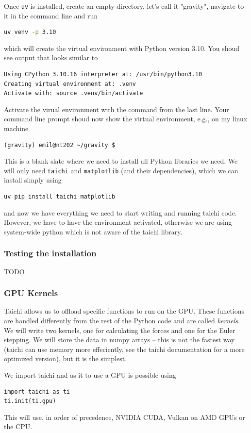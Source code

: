 \documentclass{article}
\newcommand{\ls}[1]{\lstinline{#1}}
\begin{document}
Once \ls{uv} is installed, create an empty directory, let's call it "gravity", navigate to it in the command line and run
\begin{lstlisting}[language=bash]
uv venv -p 3.10
\end{lstlisting}
which will create the virtual environment with Python version 3.10. You shoud see output that looks similar to
\begin{verbatim}
Using CPython 3.10.16 interpreter at: /usr/bin/python3.10
Creating virtual environment at: .venv
Activate with: source .venv/bin/activate
\end{verbatim}
Activate the virual environment with the command from the last line. Your command line prompt shoud now show the virtual environment, e.g., on my linux machine
\begin{verbatim}
(gravity) emil@nt202 ~/gravity $
\end{verbatim}
This is a blank slate where we need to install all Python libraries we need. We will only need \ls{taichi} and \ls{matplotlib} (and their dependencies), which we can install simply using
\begin{lstlisting}
uv pip install taichi matplotlib
\end{lstlisting}
and now we have everything we need to start writing and running taichi code. However, we have to have the environment activated, otherwise we are using system-wide python which is not aware of the taichi library.

\subsubsection{Testing the installation}
TODO

\subsubsection{GPU Kernels}
Taichi allows us to offload specific functions to run on the GPU. These functions are handled differently from the rest of the Python code and are called \emph{kernels}. We will write two kernels, one for calculating the forces and one for the Euler stepping. We will store the data in numpy arrays -- this is not the fastest way (taichi can use memory more effeciently, see the taichi documentation for a more optimized version), but it is the simplest.

We import taichi and as it to use a GPU is possible using
\begin{lstlisting}
import taichi as ti
ti.init(ti.gpu)
\end{lstlisting}
This will use, in order of precedence, NVIDIA CUDA, Vulkan on AMD GPUs or the CPU.
\end{document}
